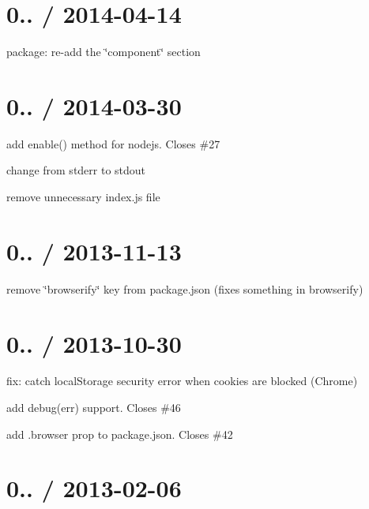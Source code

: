 \section*{0.. / 2014-\/04-\/14 }


\begin{DoxyItemize}
\item package\+: re-\/add the \char`\"{}component\char`\"{} section
\end{DoxyItemize}

\section*{0.. / 2014-\/03-\/30 }


\begin{DoxyItemize}
\item add {\ttfamily enable()} method for nodejs. Closes \#27
\item change from stderr to stdout
\item remove unnecessary index.\+js file
\end{DoxyItemize}

\section*{0.. / 2013-\/11-\/13 }


\begin{DoxyItemize}
\item remove \char`\"{}browserify\char`\"{} key from package.\+json (fixes something in browserify)
\end{DoxyItemize}

\section*{0.. / 2013-\/10-\/30 }


\begin{DoxyItemize}
\item fix\+: catch local\+Storage security error when cookies are blocked (Chrome)
\item add debug(err) support. Closes \#46
\item add .browser prop to package.\+json. Closes \#42
\end{DoxyItemize}

\section*{0.. / 2013-\/02-\/06 }


